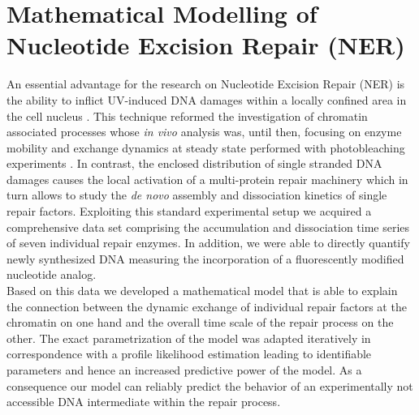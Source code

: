 \chapter{Mathematical Modelling of Nucleotide Excision Repair (NER)}
\pagestyle{plain}
%
An essential advantage for the research on Nucleotide Excision Repair (NER) is the ability to inflict UV-induced DNA damages within a locally confined area in the cell nucleus \cite{Mone2001}. This technique reformed the investigation of chromatin associated processes whose \textit{in vivo} analysis was, until then, focusing on enzyme mobility and exchange dynamics at steady state performed with photobleaching experiments \cite{Houtsmuller2001,Mone2004}. In contrast, the enclosed distribution of single stranded DNA damages causes the local activation of a multi-protein repair machinery which in turn allows to study the \textit{de novo} assembly and dissociation kinetics of single repair factors. Exploiting this standard experimental setup we acquired a comprehensive data set comprising the accumulation and dissociation time series of seven individual repair enzymes. In addition, we were able to directly quantify newly synthesized DNA measuring the incorporation of a fluorescently modified nucleotide analog.\\
Based on this data we developed a mathematical model that is able to explain the connection between the dynamic exchange of individual repair factors at the chromatin on one hand and the overall time scale of the repair process on the other. The exact parametrization of the model was adapted iteratively in correspondence with a profile likelihood estimation leading to identifiable parameters and hence an increased predictive power of the model. As a consequence our model can reliably predict the behavior of an experimentally not accessible DNA intermediate within the repair process.\\
   

